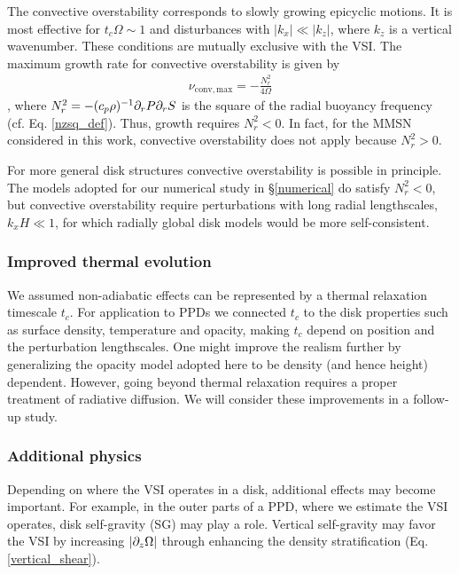 The convective overstability corresponds to slowly growing epicyclic motions.
It is most effective for $t_c\Omega \sim 1$ and disturbances with
$|k_x|\ll |k_z|$, where $k_z$ is a vertical wavenumber. These
conditions are mutually exclusive with the VSI.  
The maximum growth rate for convective overstability is given by 
\begin{align}
  \nu_\mathrm{conv,max} = -\frac{N^2_r}{4\Omega}\label{max_conv_gen}
\end{align}
\citep{lyra14}, where $N_r^2 = -(c_p\rho)^{-1}\partial_rP\partial_rS$ is the
square of the radial buoyancy frequency
(cf. Eq. \ref{nzsq_def}). Thus, growth requires $N_r^2<0$.  
In fact, for the MMSN considered in this work, convective
overstability does not apply because 
$N_r^2>0$.   

For more general disk structures convective overstability is
possible in principle. The models adopted for our numerical study in
\S\ref{numerical} do satisfy $N_r^2<0$, but convective overstability
require perturbations with long radial lengthscales,
$k_xH\ll 1$, for which radially global disk models would be more 
self-consistent. 

\subsubsection{Improved thermal evolution} 
We assumed non-adiabatic effects can be represented by a thermal
relaxation timescale $t_c$. For  
application to PPDs we connected $t_c$ to the disk
properties such as surface density, temperature and opacity, making
$t_c$ depend on position and the perturbation 
lengthscales. One might improve the realism further by generalizing
the opacity model adopted here to be density (and hence height)
dependent.  
However, going beyond thermal relaxation requires a
proper treatment of radiative diffusion. %
We will consider these improvements in a
follow-up study. %
 
\subsubsection{Additional physics} 
Depending on where the VSI operates in a
disk, additional effects may become important. For example, in the
outer parts of a PPD, where we estimate the VSI 
operates, disk self-gravity (SG) may play a role. Vertical
self-gravity may favor the VSI by increasing $|\partial_z\Omega|$ through
enhancing the density stratification 
(Eq. \ref{vertical_shear}). %

